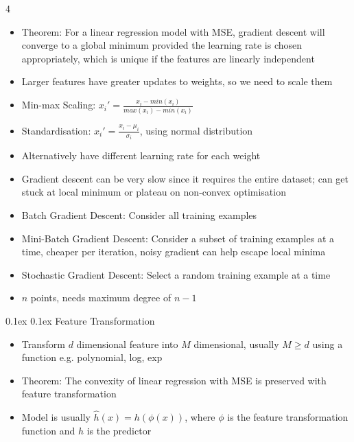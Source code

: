 \documentclass[10pt, landscape]{article}
\makeatletter
\renewcommand{\subsection}{\@startsection{subsection}{2}{0mm}%
  {0.1ex} %
  {0.1ex} %
  {\normalfont\normalsize\bfseries}}
\makeatother
\begin{document}
\begin{multicols*}{4}
\begin{itemize}
    \item Theorem: For a linear regression model with MSE, gradient descent will converge to a global minimum provided the learning rate is chosen appropriately, which is unique if the features are linearly independent
    \item Larger features have greater updates to weights, so we need to scale them
    \item Min-max Scaling: $x_i'=\frac{x_i-min(x_i)}{max(x_i)-min(x_i)}$
    \item Standardisation: $x_i'=\frac{x_i-\mu_i}{\sigma_i}$, using normal distribution
    \item Alternatively have different learning rate for each weight
    \item Gradient descent can be very slow since it requires the entire dataset; can get stuck at local minimum or plateau on non-convex optimisation
    \item Batch Gradient Descent: Consider all training examples
    \item Mini-Batch Gradient Descent: Consider a subset of training examples at a time, cheaper per iteration, noisy gradient can help escape local minima
    \item Stochastic Gradient Descent: Select a random training example at a time
    \item $n$ points, needs maximum degree of $n-1$
\end{itemize}

\subsection{Feature Transformation}
\begin{itemize}
    \item Transform $d$ dimensional feature into $M$ dimensional, usually $M \geq d$ using a function e.g. polynomial, log, exp
    \item Theorem: The convexity of linear regression with MSE is preserved with feature transformation
    \item Model is usually $\hat{h}(x)=h(\phi(x))$, where $\phi$ is the feature transformation function and $h$ is the predictor
\end{itemize}


\end{multicols*}
\end{document}
